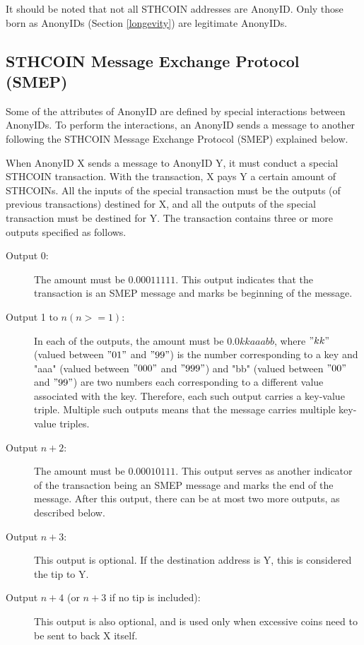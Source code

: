 \documentclass[12pt, a4paper]{article}
\begin{document}
It should be noted that not all STHCOIN addresses are AnonyID. Only those born as AnonyIDs (Section \ref{longevity}) are legitimate AnonyIDs.

\subsection{STHCOIN Message Exchange Protocol (SMEP)}

Some of the attributes of AnonyID are defined by special interactions between AnonyIDs. To perform the interactions, an AnonyID sends a message to another following the STHCOIN Message Exchange Protocol (SMEP) explained below.

When AnonyID X sends a message to AnonyID Y, it must conduct a special STHCOIN transaction. With the transaction, X pays Y a certain amount of STHCOINs. All the inputs of the special transaction must be the outputs (of previous transactions) destined for X, and all the outputs of the special transaction must be destined for Y. The transaction contains three or more outputs specified as follows.

\begin{description}
\item[Output 0:] The amount must be $0.00011111$. This output indicates that the transaction is an SMEP message and marks be beginning of the message.
\item[Output 1 to $n (n >= 1)$:] In each of the outputs, the amount must be $0.0kkaaabb$, where $"kk"$ (valued between $"01"$ and $"99"$) is the number corresponding to a key and "aaa" (valued between $"000"$ and $"999"$) and "bb" (valued between $"00"$ and $"99"$) are two numbers each corresponding to a different value associated with the key. Therefore, each such output carries a key-value triple. Multiple such outputs means that the message carries multiple key-value triples.
\item[Output $n+2$:] The amount must be $0.00010111$. This output serves as another indicator of the transaction being an SMEP message and marks the end of the message. After this output, there can be at most two more outputs, as described below.
\item[Output $n+3$:] This output is optional. If the destination address is Y, this is considered the tip to Y.
\item[Output $n+4$ (or $n+3$ if no tip is included):] This output is also optional, and is used only when excessive coins need to be sent to back X itself. 
\end{description}
\end{document}
